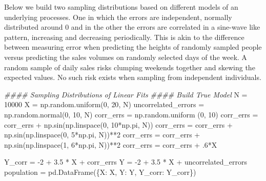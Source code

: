 \documentclass[]{tufte-book}
\newenvironment{Shaded}{}{}
\newcommand{\CommentTok}[1]{\textcolor[rgb]{0.38,0.63,0.69}{\textit{#1}}}
\newcommand{\DecValTok}[1]{\textcolor[rgb]{0.25,0.63,0.44}{#1}}
\newcommand{\FloatTok}[1]{\textcolor[rgb]{0.25,0.63,0.44}{#1}}
\newcommand{\NormalTok}[1]{#1}
\newcommand{\OperatorTok}[1]{\textcolor[rgb]{0.40,0.40,0.40}{#1}}
\newcommand{\StringTok}[1]{\textcolor[rgb]{0.25,0.44,0.63}{#1}}
\theoremstyle{definition}
\theoremstyle{definition}
\theoremstyle{definition}
\theoremstyle{remark}
\begin{document}
Below we build two sampling distributions based on different models of an underlying processes. One in which the errors are independent, normally distributed around \(0\) and in the other the errors are correlated in a sine-wave like pattern, increasing and decreasing periodically. This is akin to the difference between measuring error when predicting the heights of randomly sampled people versus predicting the sales volumes on randomly selected days of the week. A random sample of daily sales risks clumping weekends together and skewing the expected values. No such risk exists when sampling from independent individuals.

\begin{Shaded}
\begin{Highlighting}[]
\CommentTok{\#\#\#\# Sampling Distributions of Linear Fits}
\CommentTok{\#\#\#\# Build True Model}
\NormalTok{N }\OperatorTok{=} \DecValTok{10000}
\NormalTok{X }\OperatorTok{=}\NormalTok{ np.random.uniform(}\DecValTok{0}\NormalTok{, }\DecValTok{20}\NormalTok{, N)}
\NormalTok{uncorrelated\_errors }\OperatorTok{=}\NormalTok{ np.random.normal(}\DecValTok{0}\NormalTok{, }\DecValTok{10}\NormalTok{, N)}
\NormalTok{corr\_errs }\OperatorTok{=}\NormalTok{ np.random.uniform (}\DecValTok{0}\NormalTok{, }\DecValTok{10}\NormalTok{) }
\NormalTok{corr\_errs }\OperatorTok{=}\NormalTok{ corr\_errs }\OperatorTok{+}\NormalTok{ np.sin(np.linspace(}\DecValTok{0}\NormalTok{, }\DecValTok{10}\OperatorTok{*}\NormalTok{np.pi, N)) }
\NormalTok{corr\_errs }\OperatorTok{=}\NormalTok{ corr\_errs }\OperatorTok{+}\NormalTok{ np.sin(np.linspace(}\DecValTok{0}\NormalTok{, }\DecValTok{5}\OperatorTok{*}\NormalTok{np.pi, N))}\OperatorTok{**}\DecValTok{2} 
\NormalTok{corr\_errs }\OperatorTok{=}\NormalTok{ corr\_errs }\OperatorTok{+}\NormalTok{ np.sin(np.linspace(}\DecValTok{1}\NormalTok{, }\DecValTok{6}\OperatorTok{*}\NormalTok{np.pi, N))}\OperatorTok{**}\DecValTok{2}
\NormalTok{corr\_errs }\OperatorTok{=}\NormalTok{ corr\_errs }\OperatorTok{+} \FloatTok{.6}\OperatorTok{*}\NormalTok{X}

\NormalTok{Y\_corr }\OperatorTok{=} \OperatorTok{{-}}\DecValTok{2} \OperatorTok{+} \FloatTok{3.5} \OperatorTok{*}\NormalTok{ X }\OperatorTok{+}\NormalTok{ corr\_errs}
\NormalTok{Y }\OperatorTok{=} \OperatorTok{{-}}\DecValTok{2} \OperatorTok{+} \FloatTok{3.5} \OperatorTok{*}\NormalTok{ X }\OperatorTok{+}\NormalTok{ uncorrelated\_errors}
\NormalTok{population }\OperatorTok{=}\NormalTok{ pd.DataFrame(\{}\StringTok{\textquotesingle{}X\textquotesingle{}}\NormalTok{: X, }\StringTok{\textquotesingle{}Y\textquotesingle{}}\NormalTok{: Y, }\StringTok{\textquotesingle{}Y\_corr\textquotesingle{}}\NormalTok{: Y\_corr\})}


\end{Highlighting}
\end{Shaded}
\end{document}
